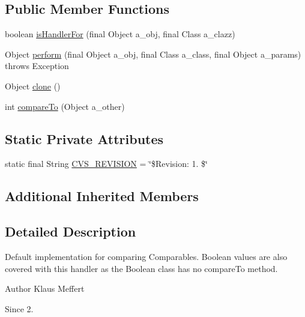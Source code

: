 \subsection*{Public Member Functions}
\begin{DoxyCompactItemize}
\item 
boolean \hyperlink{classorg_1_1jgap_1_1impl_1_1_default_compare_to_handler_ad173148802a2102c600eff4d19808ace}{is\-Handler\-For} (final Object a\-\_\-obj, final Class a\-\_\-clazz)
\item 
Object \hyperlink{classorg_1_1jgap_1_1impl_1_1_default_compare_to_handler_a6211b68a756092ae873e146e981936de}{perform} (final Object a\-\_\-obj, final Class a\-\_\-class, final Object a\-\_\-params)  throws Exception 
\item 
Object \hyperlink{classorg_1_1jgap_1_1impl_1_1_default_compare_to_handler_ade51a6ebdb606e8f14052d057eaf163e}{clone} ()
\item 
int \hyperlink{classorg_1_1jgap_1_1impl_1_1_default_compare_to_handler_a51e73c703befcf3a36d0a7c8d882dc19}{compare\-To} (Object a\-\_\-other)
\end{DoxyCompactItemize}
\subsection*{Static Private Attributes}
\begin{DoxyCompactItemize}
\item 
static final String \hyperlink{classorg_1_1jgap_1_1impl_1_1_default_compare_to_handler_af64ba608cee422cadaa3b978190f8777}{C\-V\-S\-\_\-\-R\-E\-V\-I\-S\-I\-O\-N} = \char`\"{}\$Revision\-: 1. \$\char`\"{}
\end{DoxyCompactItemize}
\subsection*{Additional Inherited Members}


\subsection{Detailed Description}
Default implementation for comparing Comparables. Boolean values are also covered with this handler as the Boolean class has no compare\-To method.

\begin{DoxyAuthor}{Author}
Klaus Meffert 
\end{DoxyAuthor}
\begin{DoxySince}{Since}
2. 
\end{DoxySince}


